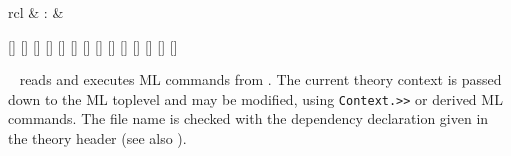 \begin{isabellebody}
\begin{isamarkuptext}
\begin{matharray}{rcl}
    \hypertarget{command.attribute-setup}{\hyperlink{command.attribute-setup}{\mbox{}}} & : &  \\
  \end{matharray}

  \begin{railoutput}
[]
[]
\rail@end
{}
\rail@bar
{}[]
[]
[]
[]
[]
[]
\rail@endbar
{}[]
\rail@end
{}
[]
[]
[]
[]
\rail@bar
{}
[]
\rail@endbar
\rail@end
\end{railoutput}


  \begin{description}

  \item \hyperlink{command.use}{\mbox{}}~ reads and executes ML
  commands from .  The current theory context is passed
  down to the ML toplevel and may be modified, using \verb|Context.>>| or derived ML commands.  The file name is checked with
  the \hyperlink{keyword.uses}{\mbox{}} dependency declaration given in the theory
  header (see also ).


\end{description}
\end{isamarkuptext}
\end{isabellebody}
